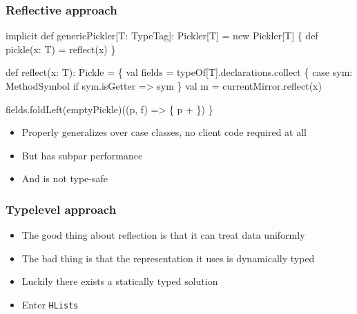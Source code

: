 \documentclass[svgnames,hyperref={bookmarks=false}]{beamer}
\begin{document}
\begin{frame}[fragile]
\frametitle{Reflective approach}

\begin{semiverbatim}
implicit def genericPickler[T: TypeTag]: Pickler[T] =
  new Pickler[T] \{ def pickle(x: T) = reflect(x) \}

def reflect(x: T): Pickle = \{
  val fields = typeOf[T].declarations.collect \{
    case sym: MethodSymbol if sym.isGetter => sym \}
  val m = currentMirror.reflect(x)

  fields.foldLeft(emptyPickle)((p, f) => \{
    p + 
  \})
\}
\end{semiverbatim}

\begin{itemize}
\item Properly generalizes over case classes, no client code required at all
\item But has subpar performance
\item And is not type-safe
\end{itemize}
\end{frame}

\begin{frame}[fragile]
\frametitle{Typelevel approach}

\begin{itemize}
\item The good thing about reflection is that it can treat data uniformly
\item The bad thing is that the representation it uses is dynamically typed
\item Luckily there exists a statically typed solution
\item Enter \texttt{HLists}
\end{itemize}
\end{frame}
\end{document}
